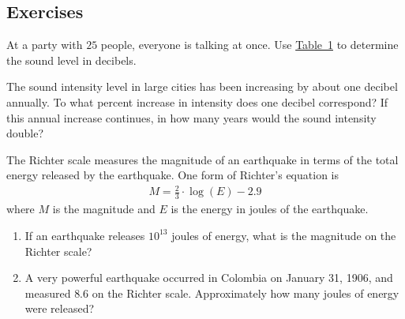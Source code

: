 \documentclass[10pt,]{book}
\theoremstyle{ptxdefinitionnotitle}
\theoremstyle{ptxdefinitiontitle}
\theoremstyle{ptxdefinitionnotitle}
\theoremstyle{ptxdefinitiontitle}
\theoremstyle{ptxdefinitionnotitle}
\theoremstyle{ptxdefinitiontitle}
\numberwithin{equation}{section}
\begin{document}
\subsection*{Exercises}\hypertarget{exercises-13}{}
\begin{divisionexercise}{1}\hypertarget{exercise-83}{}
\hypertarget{p-313}{}%
At a party with \(25\) people, everyone is talking at once.  Use \hyperref[decibel-table]{Table~1} to determine  the sound level in decibels.%
\end{divisionexercise}%
\begin{divisionexercise}{2}\hypertarget{exercise-84}{}
\hypertarget{p-314}{}%
The sound intensity level in large cities has been increasing by about one decibel annually.  To what percent increase in intensity does one decibel correspond?  If this annual increase continues, in how many years would the sound intensity double?%
\end{divisionexercise}%
\begin{divisionexercise}{3}\hypertarget{exercise-85}{}
\hypertarget{p-315}{}%
The Richter scale measures the magnitude of an earthquake in terms of the total energy released by the earthquake.  One form of Richter's equation is%
\begin{gather*}
M = \frac{2}{3} \cdot \log(E) - 2.9
\end{gather*}
where \(M\) is the magnitude and \(E\) is the energy in joules of the earthquake. \leavevmode%
\begin{enumerate}[label=(\alph*)]
\item\hypertarget{li-226}{}If an earthquake releases \(10^{13}\) joules of energy, what is the magnitude on the Richter scale?%
\item\hypertarget{li-227}{}A very powerful earthquake occurred in Colombia on January 31, 1906, and measured \(8.6\) on the Richter scale.  Approximately how many joules of energy were released?%
\end{enumerate}
%
\end{divisionexercise}%
\end{document}
